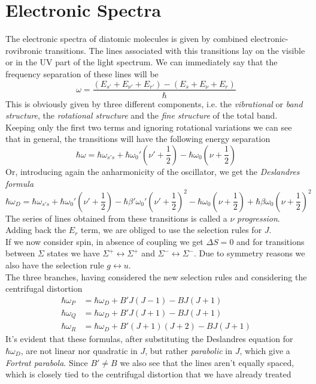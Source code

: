 \documentclass[a4paper, 11pt]{book}
\newcommand{\1}{\opr{\mathds{1}}}
\theoremstyle{plain}
\begin{document}
	\section{Electronic Spectra}
	The electronic spectra of diatomic molecules is given by combined electronic-rovibronic transitions. The lines associated with this transitions lay on the visible or in the UV part of the light spectrum. We can immediately say that the frequency separation of these lines will be
	\begin{equation}
		\omega=\frac{(E_{s'}+E_{\nu'}+E_{r'})-(E_s+E_\nu+E_r)}{\hbar}
		\label{eqelectronicspectra}
	\end{equation}
	This is obviously given by three different components, i.e. the \textit{vibrational} or \textit{band structure}, the \textit{rotational structure} and the \textit{fine structure} of the total band.\\
	Keeping only the first two terms and ignoring rotational variations we can see that in general, the transitions will have the following energy separation
	\begin{equation}
		\hbar\omega=\hbar\omega_{s's}+\hbar\omega_0'\left( \nu'+\frac{1}{2} \right)-\hbar\omega_0\left( \nu+\frac{1}{2} \right)
		\label{eq:electronicspectranorotation}
	\end{equation}
	Or, introducing again the anharmonicity of the oscillator, we get the \textit{Deslandres formula}
	\begin{equation}
		\hbar\omega_D=\hbar\omega_{s's}+\hbar\omega_0'\left( \nu'+\frac{1}{2} \right)-\hbar\beta'\omega_0'\left( \nu'+\frac{1}{2} \right)^2-\hbar\omega_0\left( \nu+\frac{1}{2} \right)+\hbar\beta\omega_0\left( \nu+\frac{1}{2} \right)^2
		\label{eq:Deslandresformula}
	\end{equation}
	The series of lines obtained from these transitions is called a $\nu$ \textit{progression}.\\
	Adding back the $E_r$ term, we are obliged to use the selection rules for $J$.\\
	If we now consider spin, in absence of coupling we get $\Delta S=0$ and for transitions between $\Sigma$ states we have $\Sigma^+\leftrightarrow\Sigma^+$ and $\Sigma^-\leftrightarrow\Sigma^-$. Due to symmetry reasons we also have the selection rule $g\leftrightarrow u$.\\
	The three branches, having considered the new selection rules and considering the centrifugal distortion
	\begin{equation}
		\begin{aligned}
			\hbar\omega_P&=\hbar\omega_D+B'J(J-1)-BJ(J+1)\\
			\hbar\omega_Q&=\hbar\omega_D+B'J(J+1)-BJ(J+1)\\
			\hbar\omega_R&=\hbar\omega_D+B'(J+1)(J+2)-BJ(J+1)
		\end{aligned}
		\label{eq:PQRsequence}
	\end{equation}
	It's evident that these formulas, after substituting the Deslandres equation for $\hbar\omega_D$, are not linear nor quadratic in $J$, but rather \textit{parabolic} in $J$, which give a \textit{Fortrat parabola}. Since $B'\ne B$ we also see that the lines aren't equally spaced, which is closely tied to the centrifugal distortion that we have already treated
\end{document}
